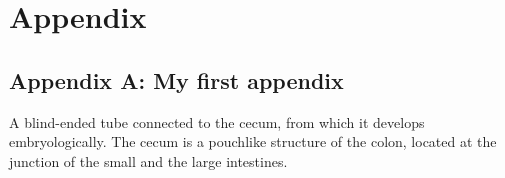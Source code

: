 
\chapter{Appendix}

\section*{Appendix A: My first appendix}
\label{app: }

A blind-ended tube connected to the cecum, from which it develops embryologically. The cecum is a pouchlike structure of the colon, located at the junction of the small and the large intestines.
